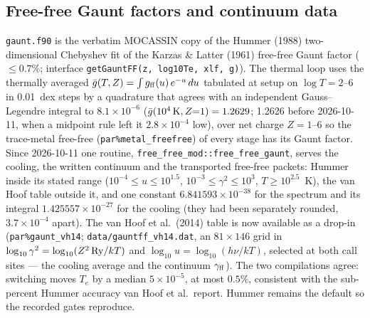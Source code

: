 \documentclass[english,a4paper]{my_memo}
\newcommand{\code}[1]{\texttt{#1}}
\begin{document}
\subsection{Free-free Gaunt factors and continuum data}
\label{sec:contdata}
\code{gaunt.f90} is the verbatim MOCASSIN copy of the Hummer (1988)
two-dimensional Chebyshev fit of the Karzas \& Latter (1961) free-free
Gaunt factor ($\leq 0.7\%$; interface
\code{getGauntFF(z, log10Te, xlf, g)}).  The thermal loop uses the
thermally averaged $\bar g(T, Z) = \int g_{\rm ff}(u)\,e^{-u}\,du$
tabulated at setup on $\log T = 2$--6 in 0.01~dex steps by a quadrature
that agrees with an independent Gauss--Legendre integral to
$8.1{\times}10^{-6}$ ($\bar g(10^4\,{\rm K}, Z{=}1) = 1.2629$; 1.2626 before
2026-10-11, when a midpoint rule left it $2.8{\times}10^{-4}$ low), over
net charge $Z = 1$--6 so the trace-metal free-free
(\code{par\%metal\_freefree}) of every stage has its Gaunt factor.  Since
2026-10-11 one routine, \code{free\_free\_mod::free\_free\_gaunt}, serves
the cooling, the written continuum and the transported free-free packets:
Hummer inside its stated range ($10^{-4} \le u \le 10^{1.5}$,
$10^{-3} \le \gamma^2 \le 10^3$, $T \ge 10^{2.5}$~K), the van Hoof table
outside it, and one constant $6.841593{\times}10^{-38}$ for the spectrum
and its integral $1.425557{\times}10^{-27}$ for the cooling (they had been
separately rounded, $3.7{\times}10^{-4}$ apart).  The van
Hoof et al.\ (2014) table is now available as a drop-in
(\code{par\%gaunt\_vh14}; \code{data/gauntff\_vh14.dat}, an
$81 \times 146$ grid in $\log_{10}\gamma^2 = \log_{10}(Z^2\,{\rm Ry}/kT)$
and $\log_{10} u = \log_{10}(h\nu/kT)$, selected at both call sites ---
the cooling average and the continuum $\gamma_{\rm ff}$).  The two
compilations agree: switching moves $T_e$ by a median
$5{\times}10^{-5}$, at most $0.5\%$, consistent with the sub-percent
Hummer accuracy van Hoof et al.\ report.  Hummer remains the default
so the recorded gates reproduce.
\end{document}
